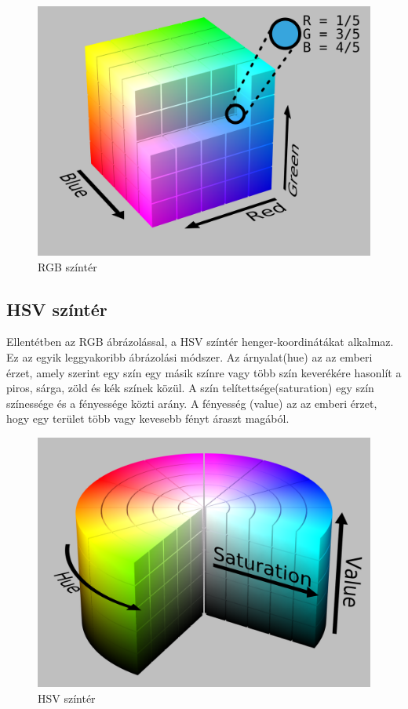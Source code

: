\begin{figure}[h]
\centering

\includegraphics[scale=0.1]{RGBColorSpace}
\caption{RGB színtér}

\label{fig:RGBColorSpace}
\end{figure}

\subsection{HSV színtér}\label{sec:PREPROC:hsv}

Ellentétben az RGB ábrázolással, a HSV színtér henger-koordinátákat alkalmaz. Ez az egyik leggyakoribb ábrázolási módszer. Az árnyalat(hue) az az emberi érzet, amely szerint egy szín egy másik színre vagy több szín keverékére hasonlít a piros, sárga, zöld és kék színek közül. A szín telítettsége(saturation) egy szín színessége és a fényessége közti arány. A fényesség (value) az az emberi érzet, hogy egy terület több vagy kevesebb fényt áraszt magából. 


\begin{figure}[h]
\centering

\includegraphics[scale=0.1]{HSVColorSpace}
\caption{HSV színtér}

\label{fig:HSVColorSpace}
\end{figure}


